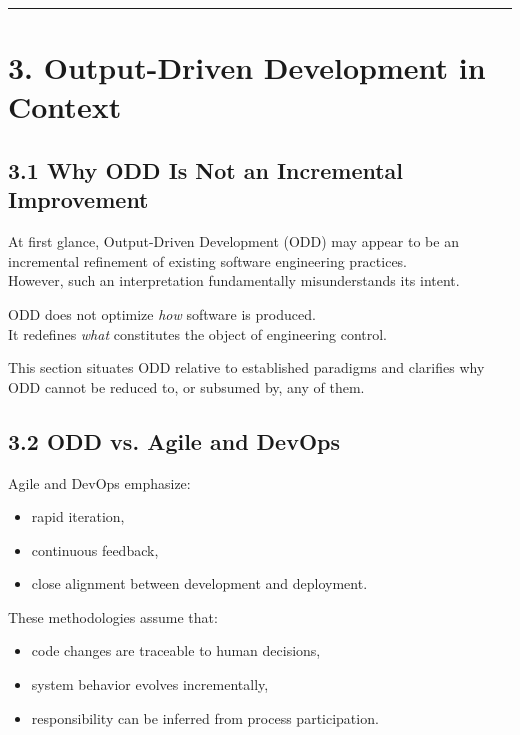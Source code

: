 \documentclass[
]{article}
\begin{document}
\begin{center}\rule{0.5\linewidth}{0.5pt}\end{center}

\hypertarget{3-output-driven-development-in-context}{%
\section{3. Output-Driven Development in
Context}\label{3-output-driven-development-in-context}}

\hypertarget{31-why-odd-is-not-an-incremental-improvement}{%
\subsection{3.1 Why ODD Is Not an Incremental
Improvement}\label{31-why-odd-is-not-an-incremental-improvement}}

At first glance, Output-Driven Development (ODD) may appear to be an
incremental refinement of existing software engineering practices.\\
However, such an interpretation fundamentally misunderstands its intent.

ODD does not optimize \emph{how} software is produced.\\
It redefines \emph{what} constitutes the object of engineering control.

This section situates ODD relative to established paradigms and
clarifies why ODD cannot be reduced to, or subsumed by, any of them.

\hypertarget{32-odd-vs-agile-and-devops}{%
\subsection{3.2 ODD vs. Agile and
DevOps}\label{32-odd-vs-agile-and-devops}}

Agile and DevOps emphasize:

\begin{itemize}
\item
  rapid iteration,
\item
  continuous feedback,
\item
  close alignment between development and deployment.
\end{itemize}

These methodologies assume that:

\begin{itemize}
\item
  code changes are traceable to human decisions,
\item
  system behavior evolves incrementally,
\item
  responsibility can be inferred from process participation.
\end{itemize}
\end{document}
